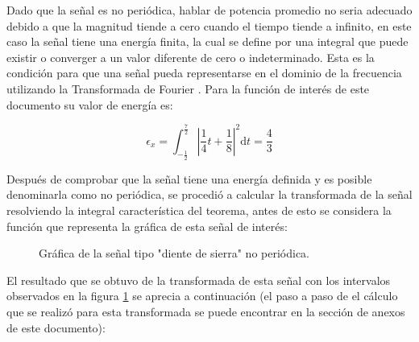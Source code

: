 \documentclass[11pt,a4paper,twocolumn]{article}
\begin{document}
    Dado que la señal es no periódica, hablar de potencia promedio no seria adecuado debido a que 
    la magnitud tiende a cero cuando el tiempo tiende a infinito, en este caso la señal tiene una
    energía finita, la cual se define por una integral que puede existir o converger a un valor
    diferente de cero o indeterminado. Esta es la condición para que una señal pueda representarse
    en el dominio de la frecuencia utilizando la Transformada de Fourier \cite{Fabian}. Para la función de interés
    de este documento su valor de energía es:
    
    \begin{equation*}
       \epsilon_x=\int_{-\frac{1}{2}}^{\frac{7}{2}}\left|\frac{1}{4}t + \frac{1}{8}\right|^2 \mathrm{d}t = \frac{4}{3}
    \end{equation*}

    Después de comprobar que la señal tiene una energía definida y es posible denominarla como no
    periódica, se procedió a calcular la transformada de la señal resolviendo la integral 
    característica del teorema, antes de esto se considera la función que representa la gráfica
    de esta señal de interés:

    \begin{figure}[H]
        \centering
        \caption{Gráfica de la señal tipo "diente de sierra" no periódica.}
        \label{funcionAsiganda}
    \end{figure}

    El resultado que se obtuvo de la transformada de esta señal con los intervalos observados en la
    figura \ref{funcionAsiganda} se aprecia a continuación (el paso a paso de el cálculo que se 
    realizó para esta transformada se puede encontrar en la sección de anexos de este documento):
    
\end{document}
